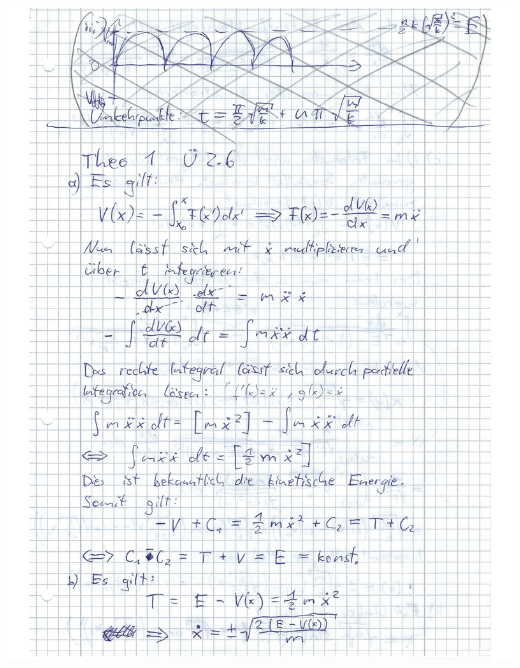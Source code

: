 \documentclass{theozettel}
\begin{document}
\begin{center}
\includegraphics[width=15cm]{A2-Teil1.pdf}\\

\end{center}
\end{document}
